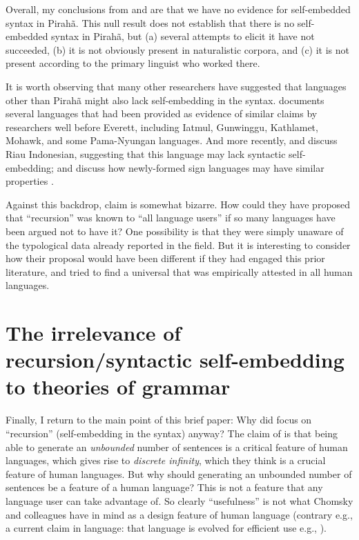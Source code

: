 \documentclass{article}
\begin{document}
Overall, my conclusions from \citet{futrell2016corpus} and \citet{sauerland2018false} are that we have no evidence for self-embedded syntax in Pirahã. This null result does not establish that there is no self-embedded syntax in Pirahã, but (a) several attempts to elicit it have not succeeded, (b) it is not obviously present in naturalistic corpora, and (c) it is not present according to the primary linguist who worked there.

\begin{sloppypar}
It is worth observing that many other researchers have suggested that languages other than Pirahã might also lack self-embedding in the syntax.  documents several languages that had been provided as evidence of similar claims by researchers well before Everett, including Iatmul, Gunwinggu, Kathlamet, Mohawk, and some Pama-Nyungan languages. And more recently, \citet{gil2009much, jackendoff2014what} and  discuss Riau Indonesian, suggesting that this language may lack syntactic self-embedding; and \citet{jackendoff2014what} discuss how newly-formed sign languages may have similar properties \citep{goldin2005resilience, sandler2005emergence}.
\end{sloppypar}

Against this backdrop,  claim is somewhat bizarre. How could they have proposed that ``recursion'' was known to ``all language users'' if so many languages have been argued not to have it? One possibility is that they were simply unaware of the typological data already reported in the field. But it is interesting to consider how their proposal would have been different if they had engaged this prior literature, and tried to find a universal that was empirically attested in all human languages. 

\section{The irrelevance of recursion/syntactic self-embedding to theories of grammar}\largerpage
\label{irrel_recursion_sec}

Finally,  I return to the main point of this brief paper: Why did \citet{hauser2002faculty} focus on ``recursion'' (self-embedding in the syntax) anyway?  The claim of \citet{hauser2002faculty} is that being able to generate an \textit{unbounded} number of sentences is a critical feature of human languages, which gives rise to \textit{discrete infinity}, which they think is a crucial feature of human languages.  But why should generating an unbounded number of sentences be a feature of a human language?  This is not a feature that any language user can take advantage of. So clearly ``usefulness'' is not what Chomsky and colleagues have in mind as a design feature of human language (contrary e.g., a current claim in language: that language is evolved for efficient use e.g., \citealt{gibson2019efficiency}).
\end{document}
